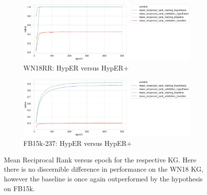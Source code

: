 
\begin{figure}[H]
	\begin{subfigure}[b]{.5\linewidth}
   		\centering
    		\includegraphics[width=1.0\linewidth, height=0.6\linewidth]{WN18RR_mean_reciprocal_rank_Results}
		\captionsetup{justification=centering}
		\caption{WN18RR: HypER versus HypER+}
	\end{subfigure}
	\begin{subfigure}[b]{.5\linewidth}
   		\centering
		\includegraphics[width=1.0\linewidth, height=0.6\linewidth]{FB15k-237_mean_reciprocal_rank_Results}
		\captionsetup{justification=centering}
		\caption{FB15k-237: HypER versus HypER+}
	\end{subfigure}
	\captionsetup{justification=centering}
	\caption{Mean Reciprocal Rank versus epoch for the respective KG. Here there is no discernible difference in performance on the WN18 KG, however the baseline is once again outperformed by the hypothesis on FB15k.}
\end{figure}

